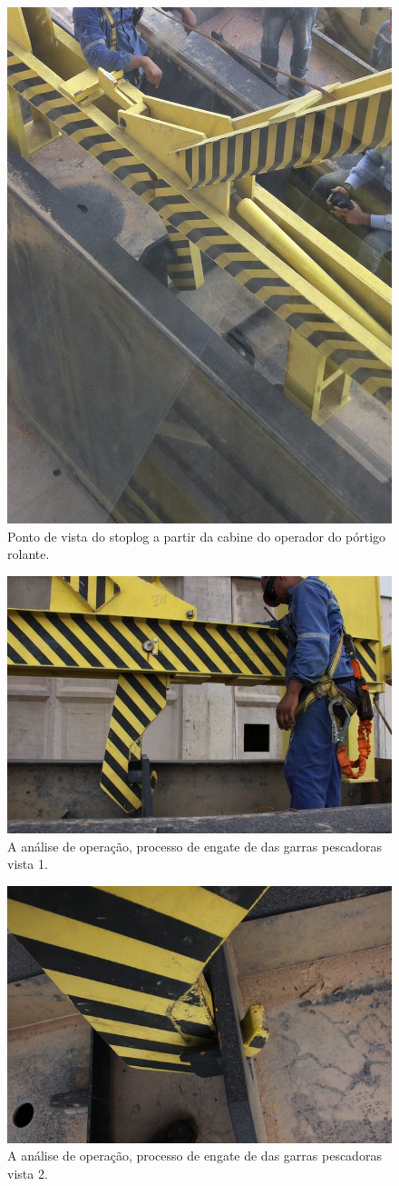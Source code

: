 \begin{figure}[h!]
    \centering \includegraphics[width=0.5\columnwidth]{figs/jirau/jirau_19}
    \caption{Ponto de vista do stoplog a partir da cabine do operador do pórtigo rolante.}
    \label{fig:jirau19}
\end{figure}

\begin{figure}[h!]
    \centering \includegraphics[width=0.6\columnwidth]{figs/jirau/jirau_20}
    \caption{A análise de operação, processo de engate de das garras pescadoras vista 1.}
    \label{fig:jirau20}
\end{figure}

\begin{figure}[h!]
    \centering \includegraphics[width=0.6\columnwidth]{figs/jirau/jirau_21}
    \caption{A análise de operação, processo de engate de das garras pescadoras vista 2.}
    \label{fig:jirau21}
\end{figure}

